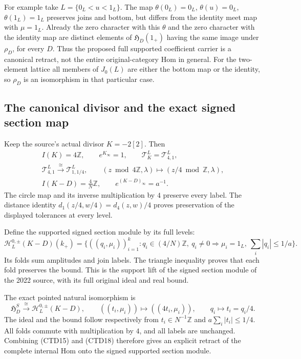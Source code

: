 For example take $L=\{0_L<u<1_L\}$. The map
$\theta(0_L)=0_L$, $\theta(u)=0_L$, $\theta(1_L)=1_L$
preserves joins and bottom, but differs from the identity
meet map with $\mu=1_L$. Already the zero character with this
$\theta$ and the zero character with the identity map are
distinct elements of $\mathfrak H_D(1_+)$ having the same
image under $\rho_D$, for every $D$.
Thus the proposed full supported coefficient carrier is a
canonical retract, not the entire original-category Hom in
general. For the two-element lattice all members of $J_0(L)$
are either the bottom map or the identity, so $\rho_D$ is an
isomorphism in that particular case.

\subsection{The canonical divisor and the exact signed section map}

Keep the source's actual divisor $K=-2[2]$. Then
\begin{equation}\tag{CTD16}
\begin{gathered}
I(K)=4\mathbb Z,\qquad e^{K_\infty}=1,\qquad
\mathcal T_K^L=\mathcal T^L_{4,1},\\
\mathcal T^L_{4,1}\xrightarrow{\ \cong\ }\mathcal T^L_{1,1/4},
\qquad (z\bmod4\mathbb Z,\lambda)
\longmapsto(z/4\bmod\mathbb Z,\lambda),\\
I(K-D)=\frac4N\mathbb Z,\qquad
e^{(K-D)_\infty}=a^{-1}.
\end{gathered}
\end{equation}
The circle map and its inverse multiplication by $4$ preserve
every label. The distance identity $d_1(z/4,w/4)=d_4(z,w)/4$
proves preservation of the displayed tolerances at every level.

Define the supported signed section module by its full levels:
\begin{equation}\tag{CTD17}
\mathcal H^{0,\pm}_L(K-D)(k_+)
=\{((q_i,\mu_i))_{i=1}^k:
q_i\in(4/N)\mathbb Z,\ q_i\ne0\Rightarrow\mu_i=1_L,\
\sum_i|q_i|\le1/a\}.
\end{equation}
Its folds sum amplitudes and join labels. The triangle inequality
proves that each fold preserves the bound. This is the
support lift of the signed section module of the 2022 source,
with its full original ideal and real bound.

The exact pointed natural isomorphism is
\begin{equation}\tag{CTD18}
\mathfrak H_D^S\xrightarrow{\ \cong\ }\mathcal H^{0,\pm}_L(K-D),
\qquad ((t_i,\mu_i))\longmapsto((4t_i,\mu_i)),
\qquad q_i\longmapsto t_i=q_i/4.
\end{equation}
The ideal and the bound follow respectively from
$t_i\in N^{-1}\mathbb Z$ and
$a\sum_i|t_i|\le1/4$. All folds commute with multiplication by
$4$, and all labels are unchanged. Combining (CTD15) and
(CTD18) therefore gives an explicit retract of the complete
internal Hom onto the signed supported section module.

